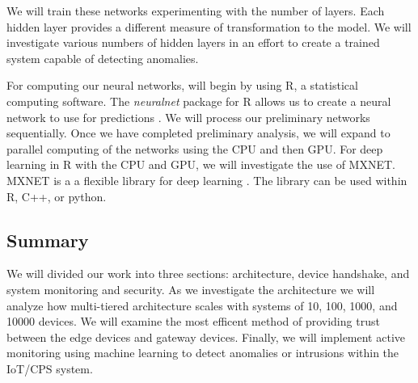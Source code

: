 \documentclass[../main.tex]{subfiles}
\begin{document}
We will train these networks experimenting with the number of layers. Each hidden layer provides a different measure of transformation to the model. We will investigate various numbers of hidden layers in an effort to create a trained system capable of detecting anomalies.

For computing our neural networks, will begin by using R, a statistical computing software. The \textit{neuralnet} package for R allows us to create a neural network to use for predictions \cite{nnet-r}. We will process our preliminary networks sequentially.  Once we have completed preliminary analysis, we will expand to parallel computing of the networks using the CPU and then GPU. For deep learning in R with the CPU and GPU, we will investigate the use of MXNET. MXNET is a a flexible library for deep learning \cite{mx}. The library can be used within R, C++, or python. 


\subsection{Summary}
We will divided our work into three sections: architecture, device handshake, and system monitoring and security. As we investigate the architecture we will analyze how multi-tiered architecture scales with systems of 10, 100, 1000, and 10000 devices. We will examine the most efficent method of providing trust between the edge devices and gateway devices. Finally, we will implement active monitoring using machine learning to detect anomalies or intrusions within the IoT/CPS system. 
\end{document}
